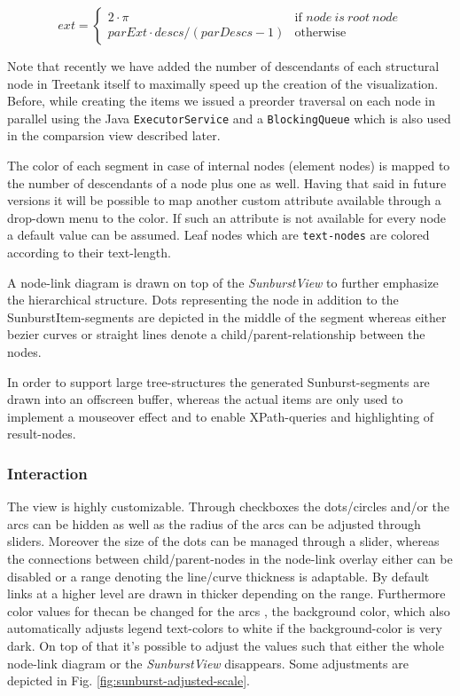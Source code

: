 \begin{itemize}
\begin{equation}
ext = \left\{ \begin{array}{cl}
2 \cdot \pi & \textrm{if }node\ is\ root\ node\\
parExt \cdot descs / (parDescs - 1) & \textrm{otherwise}\end{array}\right.
\end{equation}

Note that recently we have added the number of descendants of each structural node in Treetank itself to maximally speed up the creation of the visualization. Before, while creating the items we issued a preorder traversal on each node in parallel using the Java \texttt{ExecutorService} and a \texttt{BlockingQueue} which is also used in the comparsion view described later.


The color of each segment in case of internal nodes (element nodes) is mapped to the number of descendants of a node plus one as well. Having that said in future versions it will be possible to map another custom attribute available through a drop-down menu to the color. If such an attribute is not available for every node a default value can be assumed. Leaf nodes which are \texttt{text-nodes} are colored according to their text-length.

A node-link diagram is drawn on top of the \emph{SunburstView} to further emphasize the hierarchical structure. Dots representing the node in addition to the SunburstItem-segments are depicted in the middle of the segment whereas either bezier curves or straight lines denote a child/parent-relationship between the nodes.

In order to support large tree-structures the generated Sunburst-segments are drawn into an offscreen buffer, whereas the actual items are only used to implement a mouseover effect and to enable XPath-queries and highlighting of result-nodes.

\subsubsection{Interaction}
The view is highly customizable. Through checkboxes the dots/circles and/or the arcs can be hidden as well as the radius of the arcs can be adjusted through sliders. Moreover the size of the dots can be managed through a slider, whereas the connections between child/parent-nodes in the node-link overlay either can be disabled or a range denoting the line/curve thickness is adaptable. By default links at a higher level are drawn in thicker depending on the range. Furthermore color values for thecan be changed for the arcs , the background color, which also automatically adjusts legend text-colors to white if the background-color is very dark. On top of that it's possible to adjust the values such that either the whole node-link diagram or the \emph{SunburstView} disappears. Some adjustments are depicted in Fig. \ref{fig:sunburst-adjusted-scale}.


\end{itemize}

